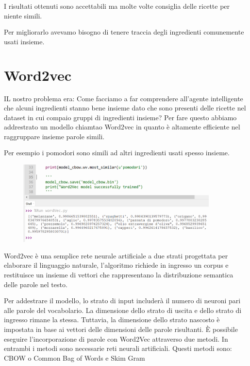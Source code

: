 \documentclass[12pt]{report}
\begin{document}
I risultati ottenuti sono accettabili ma molte volte consiglia delle ricette per niente simili.

Per migliorarlo avevamo bisogno di tenere traccia degli ingredienti comunemente usati insieme. 

\section{Word2vec}

IL nostro problema era: Come facciamo a far comprendere all’agente intelligente che alcuni ingredienti stanno bene insieme dato che sono presenti delle ricette nel dataset in cui compaio gruppi di ingredienti insieme?
Per fare questo abbiamo addrestrato un modello chiamtao Word2vec in quanto è  altamente efficiente nel raggruppare insieme parole simili.

Per esempio i pomodori sono simili ad altri ingredienti usati spesso insieme. 

\begin{figure}[H]
        \centering
        {\includegraphics[width=0.9\textwidth]{img/img13.jpg}}
\end{figure}

Word2vec è una semplice rete neurale artificiale a due strati progettata per elaborare il linguaggio naturale, l'algoritmo richiede in ingresso un corpus e restituisce un insieme di vettori che rappresentano la distribuzione semantica delle parole nel testo.

Per addestrare il modello, lo strato di input includerà il numero di neuroni pari alle parole del vocabolario. La dimensione dello strato di uscita e dello strato di ingresso rimane la stessa. Tuttavia, la dimensione dello strato nascosto è impostata in base ai vettori delle dimensioni delle parole risultanti. È possibile eseguire l’incorporazione di parole con Word2Vec attraverso due metodi. In entrambi i metodi sono necessarie reti neurali artificiali. Questi metodi sono: CBOW o Common Bag of Words e Skim Gram
\end{document}
